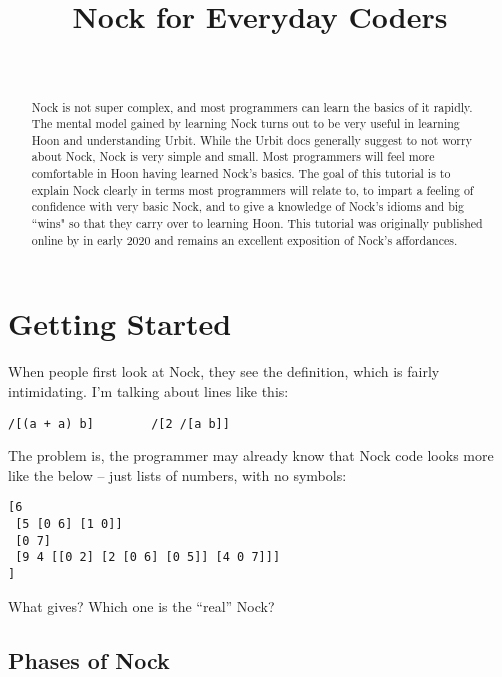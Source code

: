 \documentclass[twoside]{article}
\title{Nock for Everyday Coders}
\author{\authorname~\authorpatp \\ \affiliation}
\date{}
\begin{document}
\maketitle
\thispagestyle{firststyle}

\begin{abstract}
  Nock is not super complex, and most programmers can learn the basics of it rapidly. The mental model gained by learning Nock turns out to be very useful in learning Hoon and understanding Urbit.
  While the Urbit docs generally suggest to not worry about Nock, Nock is very simple and small.  Most programmers will feel more comfortable in Hoon having learned Nock's basics.
  The goal of this tutorial is to explain Nock clearly in terms most programmers will relate to, to impart a feeling of confidence with very basic Nock, and to give a knowledge of Nock’s idioms and big ``wins" so that they carry over to learning Hoon.
  This tutorial was originally published online by  in early 2020 and remains an excellent exposition of Nock's affordances.
\end{abstract}

\setcounter{page}{1}

\tableofcontents

\section{Getting Started}

When people first look at Nock, they see the definition, which is fairly intimidating.  I'm talking about lines like this:

\begin{lstlisting}[style=listingcode]
/[(a + a) b]        /[2 /[a b]]
\end{lstlisting}

The problem is, the programmer may already know that Nock code looks more like the below – just lists of numbers, with no symbols:

\begin{lstlisting}[style=listingcode]
[6
 [5 [0 6] [1 0]]
 [0 7]
 [9 4 [[0 2] [2 [0 6] [0 5]] [4 0 7]]]
]
\end{lstlisting}

What gives? Which one is the ``real'' Nock?

\subsection{Phases of Nock}
\end{document}
